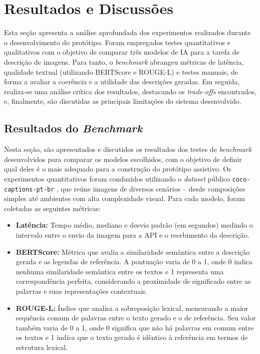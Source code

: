 \chapter{Resultados e Discussões} \label{cap:04}

Esta seção apresenta a análise aprofundada dos experimentos realizados durante o desenvolvimento do protótipo. Foram empregados testes quantitativos e qualitativos com o objetivo de comparar três modelos de IA para a tarefa de descrição de imagens. Para tanto, o \textit{benchmark} abrangeu métricas de latência, qualidade textual (utilizando BERTScore e ROUGE-L) e testes manuais, de forma a avaliar a coerência e a utilidade das descrições geradas. Em seguida, realiza-se uma análise crítica dos resultados, destacando os \textit{trade-offs} encontrados, e, finalmente, são discutidas as principais limitações do sistema desenvolvido.

\section{Resultados do \textit{Benchmark}}

Nesta seção, são apresentados e discutidos os resultados dos testes de \textit{benchmark} desenvolvidos para comparar os modelos escolhidos, com o objetivo de definir qual deles é o mais adequado para a construção do protótipo assistivo. Os experimentos quantitativos foram conduzidos utilizando o \textit{dataset} público \texttt{coco-captions-pt-br} \cite{bromonschenkel2024cocopt}, que reúne imagens de diversos cenários – desde composições simples até ambientes com alta complexidade visual. Para cada modelo, foram coletadas as seguintes métricas:

\begin{itemize}
    \item \textbf{Latência:} Tempo médio, mediano e desvio padrão (em segundos) medindo o intervalo entre o envio da imagem para a API e o recebimento da descrição.
    \item \textbf{BERTScore:} Métrica que avalia a similaridade semântica entre a descrição gerada e as legendas de referência. A pontuação varia de 0 a 1, onde 0 indica nenhuma similaridade semântica entre os textos e 1 representa uma correspondência perfeita, considerando a proximidade de significado entre as palavras e suas representações contextuais.
    \item \textbf{ROUGE-L:} Índice que analisa a sobreposição lexical, mensurando a maior sequência comum de palavras entre o texto gerado e o de referência. Seu valor também varia de 0 a 1, onde 0 significa que não há palavras em comum entre os textos e 1 indica que o texto gerado é idêntico à referência em termos de estrutura lexical.

\end{itemize}

